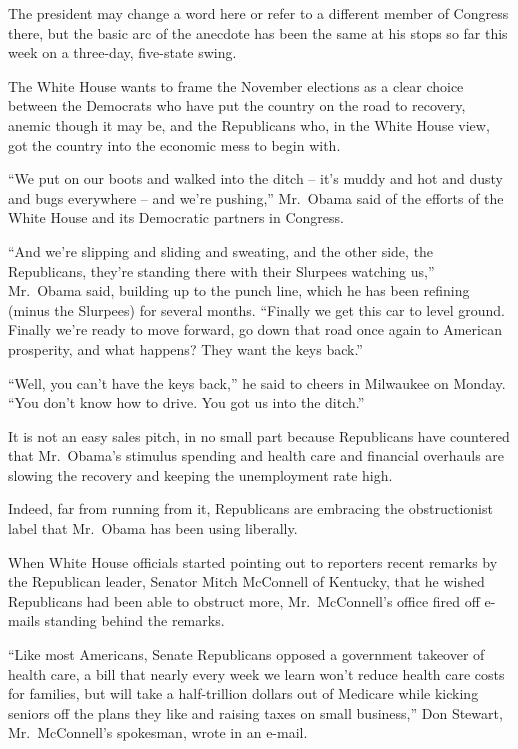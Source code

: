 ﻿\documentclass[12pt]{article}
\begin{document}
The president may change a word here or refer to a different member of Congress there, but the basic
arc of the anecdote has been the same at his stops so far this week on a three-day, five-state
swing.

The White House wants to frame the November elections as a clear choice between the Democrats who
have put the country on the road to recovery, anemic though it may be, and the Republicans who, in
the White House view, got the country into the economic mess to begin with.

``We put on our boots and walked into the ditch -- it's muddy and hot and dusty and bugs everywhere
-- and we're pushing,'' Mr.~Obama said of the efforts of the White House and its Democratic partners
in Congress.

``And we're slipping and sliding and sweating, and the other side, the Republicans, they're standing
there with their Slurpees watching us,'' Mr.~Obama said, building up to the punch line, which he has
been refining (minus the Slurpees) for several months. ``Finally we get this car to level ground.
Finally we're ready to move forward, go down that road once again to American prosperity, and what
happens? They want the keys back.''

``Well, you can't have the keys back,'' he said to cheers in Milwaukee on Monday. ``You don't know
how to drive. You got us into the ditch.''

It is not an easy sales pitch, in no small part because Republicans have countered that Mr.~Obama's
stimulus spending and health care and financial overhauls are slowing the recovery and keeping the
unemployment rate high.

Indeed, far from running from it, Republicans are embracing the obstructionist label that Mr.~Obama
has been using liberally.

When White House officials started pointing out to reporters recent remarks by the Republican
leader, Senator Mitch McConnell of Kentucky, that he wished Republicans had been able to obstruct
more, Mr.~McConnell's office fired off e-mails standing behind the remarks.

``Like most Americans, Senate Republicans opposed a government takeover of health care, a bill that
nearly every week we learn won't reduce health care costs for families, but will take a
half-trillion dollars out of Medicare while kicking seniors off the plans they like and raising
taxes on small business,'' Don Stewart, Mr.~McConnell's spokesman, wrote in an e-mail.
\end{document}
